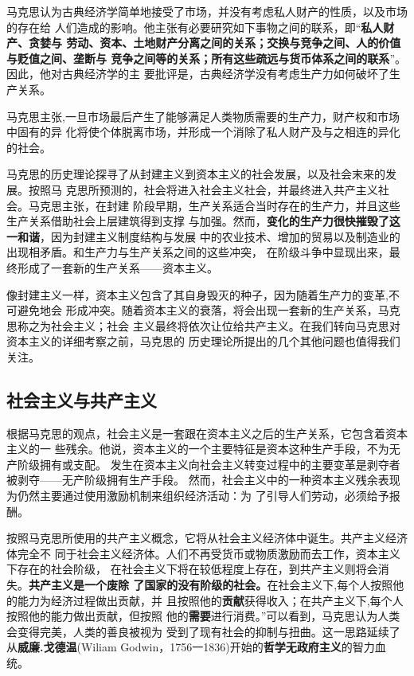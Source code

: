 马克思认为古典经济学简单地接受了市场，并没有考虑私人财产的性质，以及市场的存在给
人们造成的影响。他主张有必要研究如下事物之间的联系，即“\textbf{私人财产、贪婪与
  劳动、资本、土地财产分离之间的关系；交换与竞争之间、人的价值与贬值之间、垄断与
  竞争之间等的关系；所有这些疏远与货币体系之间的联系}”。因此，他对古典经济学的主
要批评是，古典经济学没有考虑生产力如何破坏了生产关系。

马克思主张,一旦市场最后产生了能够满足人类物质需要的生产力，财产权和市场中固有的异
化将使个体脱离市场，并形成一个消除了私人财产及与之相连的异化的社会。

马克思的历史理论探寻了从封建主义到资本主义的社会发展，以及社会末来的发展。按照马
克思所预测的，社会将进入社会主义社会，并最终进入共产主义社会。马克思主张，在封建
阶段早期，生产关系适合当时存在的生产力，并且这些生产关系借助社会上层建筑得到支撑
与加强。然而，\textbf{变化的生产力很快摧毁了这一和谐}，因为封建主义制度结构与发展
中的农业技术、增加的贸易以及制造业的出现相矛盾。和生产力与生产关系之间的这些冲突，
在阶级斗争中显现出来，最终形成了一套新的生产关系——资本主义。

像封建主义一样，资本主义包含了其自身毁灭的种子，因为随着生产力的变革,不可避免地会
形成冲突。随着资本主义的衰落，将会出现一套新的生产关系，马克思称之为社会主义；社会
主义最终将依次让位给共产主义。在我们转向马克思对资本主义的详细考察之前，马克思的
历史理论所提出的几个其他问题也值得我们关注。

\subsection{社会主义与共产主义}

根据马克思的观点，社会主义是一套跟在资本主义之后的生产关系，它包含着资本主义的一
些残余。他说，资本主义的一个主要特征是资本这种生产手段，不为无产阶级拥有或支配。
发生在资本主义向社会主义转变过程中的主要变革是剥夺者被剥夺——无产阶级拥有生产手段。
然而，社会主义中的一种资本主义残余表现为仍然主要通过使用激励机制来组织经济活动：为
了引导人们劳动，必须给予报酬。

按照马克思所使用的共产主义概念，它将从社会主义经济体中诞生。共产主义经济体完全不
同于社会主义经济体。人们不再受货币或物质激励而去工作，资本主义下存在的社会阶级，
在社会主义下将在较低程度上存在，到共产主义则将会消失。\textbf{共产主义是一个废除
  了国家的没有阶级的社会。}在社会主义下,每个人按照他的能力为经济过程做出贡献，并
且按照他的\textbf{贡献}获得收入；在共产主义下,每个人按照他的能力做出贡献，但按照
他的\textbf{需要}进行消费。”可以看到，马克思认为人类会变得完美，人类的善良被视为
受到了现有社会的抑制与扭曲。这一思路延续了从\textbf{威廉.戈德温}(Wiliam
Godwin，1756一1836)开始的\textbf{哲学无政府主义}的智力血统。

